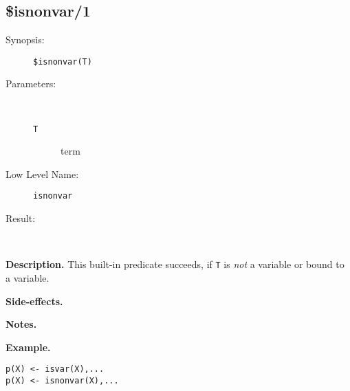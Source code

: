 %
%
%
\subsection{\$isnonvar/1}

\begin{description}
\item[Synopsis:]
	{\tt \$isnonvar(T)}
\item[Parameters:]\ \\[-0.5cm]
	\begin{description}
	\item[{\tt T}] term
	\end{description}
\item[Low Level Name:]
	{\tt isnonvar}
\item[Result:]\ \\
\end{description}

\vspace*{0.5cm}
\noindent
{\bf Description.}
This built-in predicate succeeds, if {\tt T} is
{\em not\/} a variable or bound to a variable.

\vspace*{0.5cm}
\noindent
{\bf Side-effects.}

\vspace*{0.5cm}
\noindent
{\bf Notes.}

\vspace*{0.5cm}
\noindent
{\bf Example.}
\begin{verbatim}
p(X) <- isvar(X),...
p(X) <- isnonvar(X),...
\end{verbatim}


